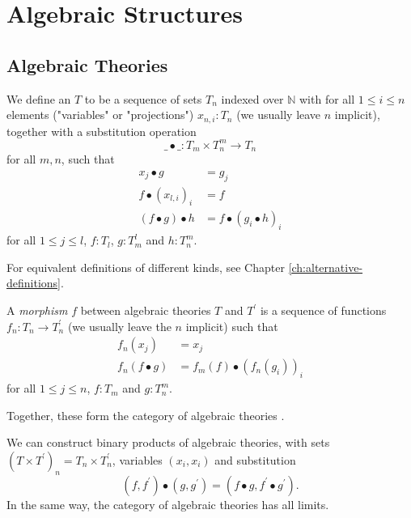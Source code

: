 \chapter{Algebraic Structures}

\section{Algebraic Theories}\label{sec:algebraic-theories}

\begin{definition}
  We define an  $ T $ to be a sequence of sets $ T_n $ indexed over $ \mathbb N $ with for all $ 1 \leq i \leq n $ elements ("variables" or "projections") $ x_{n, i}: T_n $ (we usually leave $ n $ implicit), together with a substitution operation
  \[ \_ \bullet \_: T_m \times T_n^m \to T_n \]
  for all $ m, n $, such that
  \begin{align*}
    x_j \bullet g &= g_j\\
    f \bullet (x_{l, i})_i &= f\\
    (f \bullet g) \bullet h &= f \bullet (g_i \bullet h)_i
  \end{align*}
  for all $ 1 \leq j \leq l $, $ f: T_l $, $ g: T_m^l $ and $ h: T_n^m $.
\end{definition}

\begin{remark}
  For equivalent definitions of different kinds, see Chapter \ref{ch:alternative-definitions}.
\end{remark}

\begin{definition}
  A \textit{morphism} $ f $ between algebraic theories $ T $ and $ T^\prime $ is a sequence of functions $ f_n: T_n \to T^\prime_n $ (we usually leave the $ n $ implicit) such that
  \begin{align*}
    f_n(x_j) &= x_j\\
    f_n(f \bullet g) &= f_m(f) \bullet (f_n(g_i))_i
  \end{align*}
  for all $ 1 \leq j \leq n $, $ f: T_m $ and $ g: T_n^m $.
\end{definition}

Together, these form the category of algebraic theories \iindex{$ \AlgTh $}.

\begin{remark}
  We can construct binary products of algebraic theories, with sets $ (T \times T^\prime)_n = T_n \times T^\prime_n $, variables $ (x_i, x_i) $ and substitution
  \[ (f, f^\prime) \bullet (g, g^\prime) = (f \bullet g, f^\prime \bullet g^\prime). \]
  In the same way, the category of algebraic theories has all limits.
\end{remark}

